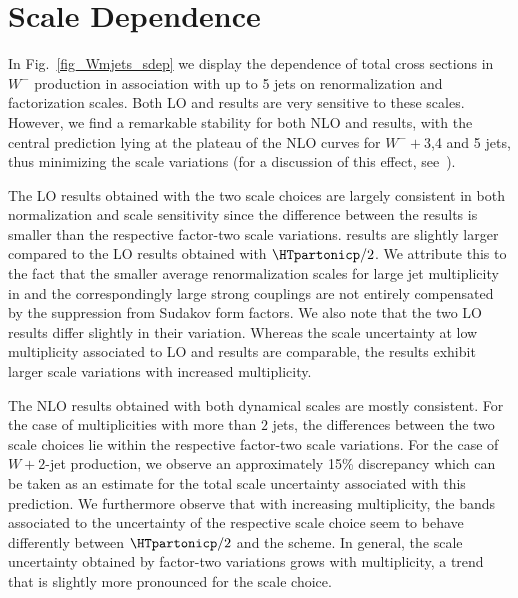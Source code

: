 \section{Scale Dependence}\label{vscale}
In Fig.~\ref{fig_Wmjets_sdep} we display the dependence of total cross sections
in $W^-$ production in association with up to 5 jets on renormalization
and factorization scales. Both LO and \MILOp{} results are very sensitive
to these scales. However, we find a remarkable stability for both NLO
and \MINLOp{} results, with the central prediction lying at the plateau of the NLO curves for
$W^-+$3,4 and 5 jets, thus minimizing the scale variations (for a discussion of this effect, see~\cite{BH:W3jDistributions}).


The LO results obtained with the two scale choices are largely consistent in both normalization and scale sensitivity since the difference between the results is smaller than the respective factor-two scale variations. \MILOp{}
results are slightly larger compared to the LO results obtained with $\HTpartonicp/2$.
%
We attribute this to the fact that the smaller average renormalization scales
for large jet multiplicity in \MILOp{} and the correspondingly large strong couplings
are not entirely compensated by the suppression from Sudakov form
factors. We also note that the two LO results differ slightly in their
variation. Whereas the scale uncertainty at low multiplicity
associated to LO and \MILOp{} results are comparable, the \MILOp{}
results exhibit larger scale variations with increased
multiplicity.


The NLO results obtained with both dynamical scales are mostly
consistent. For the case of multiplicities with more than $2$ jets, the differences between
the two scale choices lie within the respective factor-two scale
variations. For the case of $W+2$-jet production, we observe an
approximately 15\% discrepancy which can be taken as an estimate for the total scale uncertainty
associated with this prediction. We furthermore observe that with increasing
multiplicity, the bands associated to the uncertainty of the respective scale
choice seem to behave differently between $\HTpartonicp/2$ and the \MINLOp{}
scheme. In general, the scale uncertainty obtained by factor-two variations
grows with multiplicity, a trend that is slightly more pronounced for the
\MINLOp{} scale choice.

